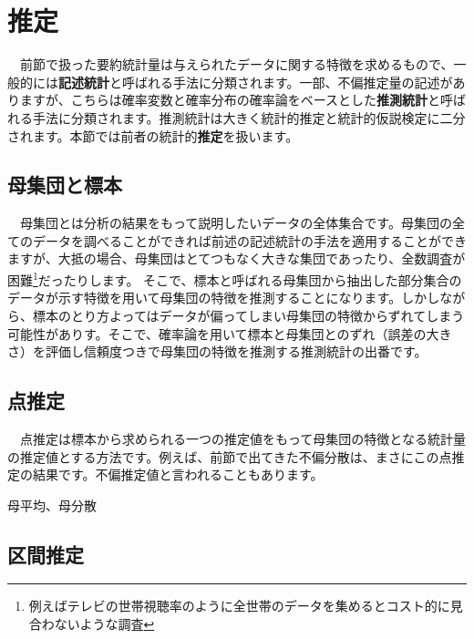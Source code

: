 \documentclass[
  12pt,
]{book}
\begin{document}
\newpage

\hypertarget{ux63a8ux5b9a}{%
\section{推定}\label{ux63a8ux5b9a}}

　前節で扱った要約統計量は与えられたデータに関する特徴を求めるもので、一般的には\textbf{記述統計}と呼ばれる手法に分類されます。一部、不偏推定量の記述がありますが、こちらは確率変数と確率分布の確率論をベースとした\textbf{推測統計}と呼ばれる手法に分類されます。推測統計は大きく統計的推定と統計的仮説検定に二分されます。本節では前者の統計的\textbf{推定}を扱います。

\hypertarget{ux6bcdux96c6ux56e3ux3068ux6a19ux672c}{%
\subsection{母集団と標本}\label{ux6bcdux96c6ux56e3ux3068ux6a19ux672c}}

　母集団とは分析の結果をもって説明したいデータの全体集合です。母集団の全てのデータを調べることができれば前述の記述統計の手法を適用することができますが、大抵の場合、母集団はとてつもなく大きな集団であったり、全数調査が困難\footnote{例えばテレビの世帯視聴率のように全世帯のデータを集めるとコスト的に見合わないような調査}だったりします。 そこで、標本と呼ばれる母集団から抽出した部分集合のデータが示す特徴を用いて母集団の特徴を推測することになります。しかしながら、標本のとり方よってはデータが偏ってしまい母集団の特徴からずれてしまう可能性がありす。そこで、確率論を用いて標本と母集団とのずれ（誤差の大きさ）を評価し信頼度つきで母集団の特徴を推測する推測統計の出番です。

\hypertarget{ux70b9ux63a8ux5b9a}{%
\subsection{点推定}\label{ux70b9ux63a8ux5b9a}}

　点推定は標本から求められる一つの推定値をもって母集団の特徴となる統計量の推定値とする方法です。例えば、前節で出てきた不偏分散は、まさにこの点推定の結果です。不偏推定値と言われることもあります。

母平均、母分散

\hypertarget{ux533aux9593ux63a8ux5b9a}{%
\subsection{区間推定}\label{ux533aux9593ux63a8ux5b9a}}
\end{document}
